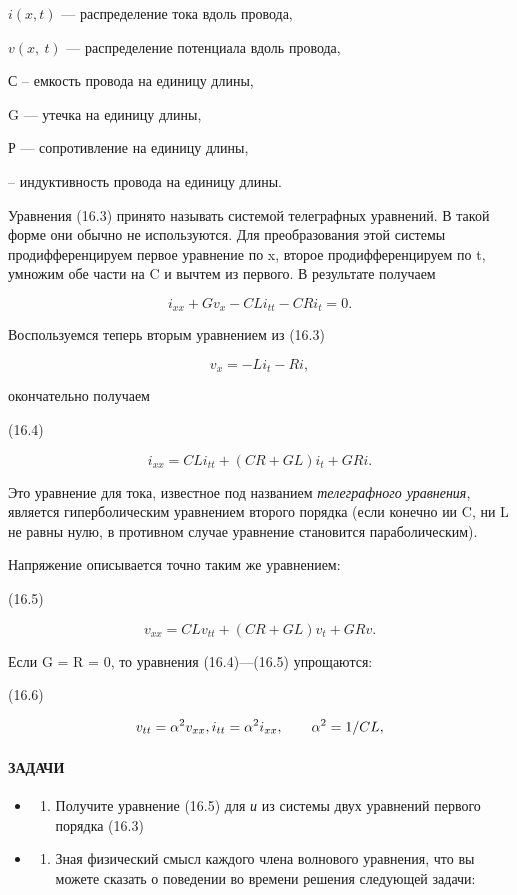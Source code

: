 \documentclass[
  ukrainian,
]{article}
\providecommand{\tightlist}{%
  \setlength{\itemsep}{0pt}\setlength{\parskip}{0pt}}
\begin{document}
\(i(x, t)\) --- распределение тока вдоль провода,

\(v\left(x,\ t\right)\) --- распределение потенциала вдоль провода,

С -- емкость провода на единицу длины,

G --- утечка на единицу длины,

Р --- сопротивление на единицу длины,

-- индуктивность провода на единицу длины.

Уравнения (16.3) принято называть системой телеграфных уравнений. В
такой форме они обычно не используются. Для преобразования этой системы
продифференцируем первое уравнение по x, второе продифференцируем по t,
умножим обе части на C и вычтем из первого. В результате получаем

\[
i_{xx} + Gv_x - CLi_{tt} - CRi_t = 0.
\]

Воспользуемся теперь вторым уравнением из (16.3)

\[
v_{x} = -Li_{t} - Ri,
\]

окончательно получаем

(16.4)

\[
i_{xx} = CLi_{tt} + (CR + GL)i_t + GRi.
\]

Это уравнение для тока, известное под названием \emph{телеграфного
уравнения}, является гиперболическим уравнением второго порядка (если
конечно ии C, ни L не равны нулю, в противном случае уравнение
становится параболическим).

Напряжение описывается точно таким же уравнением:

(16.5)

\[
v_{xx} = CLv_{tt} + (CR + GL)v_t + GRv.
\]

Если G = R = 0, то уравнения (16.4)---(16.5) упрощаются:

(16.6)

\[
v_{tt} = \alpha^2 v_{xx}, \\ i_{tt} = \alpha^2 i_{xx}, \qquad \alpha^2 = 1/CL,
\]

\paragraph{ЗАДАЧИ}\label{ux437ux430ux434ux430ux447ux438-1}

\begin{itemize}
\tightlist
\item
  \begin{enumerate}
  \def\labelenumi{\arabic{enumi}.}
  \tightlist
  \item
    Получите уравнение (16.5) для \emph{и} из системы двух уравнений
    первого порядка (16.3)
  \end{enumerate}
\item
  \begin{enumerate}
  \def\labelenumi{\arabic{enumi}.}
  \setcounter{enumi}{1}
  \tightlist
  \item
    Зная физический смысл каждого члена волнового уравнения, что вы
    можете сказать о поведении во времени решения следующей задачи:
  \end{enumerate}
\end{itemize}
\end{document}
